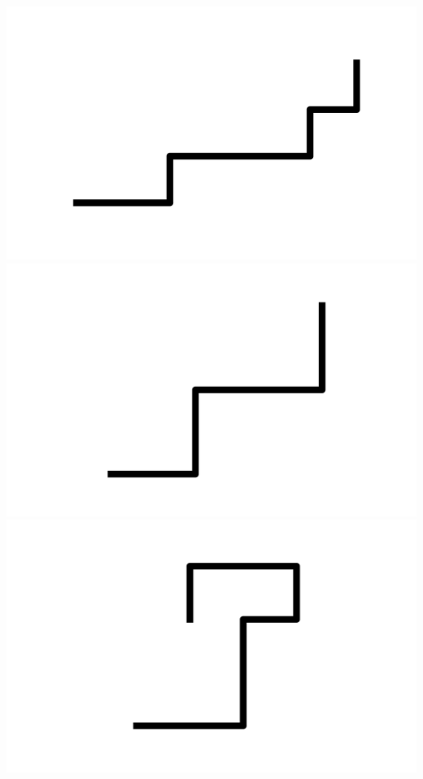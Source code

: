 \documentclass[]{report}
\begin{document}
\includegraphics[scale=.1]{pictures/21/state_cluster_shapes_349.pdf} 
\includegraphics[scale=.1]{pictures/21/state_cluster_shapes_350.pdf} 
\includegraphics[scale=.1]{pictures/21/state_cluster_shapes_351.pdf} 
\end{document}
